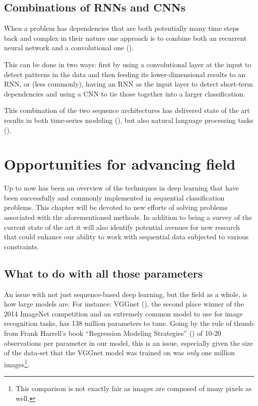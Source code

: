 \documentclass[]{book}
\let\rmarkdownfootnote\footnote%
\def\footnote{\protect\rmarkdownfootnote}
\theoremstyle{definition}
\theoremstyle{definition}
\theoremstyle{definition}
\theoremstyle{remark}
\begin{document}
\section{Combinations of RNNs and
CNNs}\label{combinations-of-rnns-and-cnns}

When a problem has dependencies that are both potentially many time
steps back and complex in their nature one approach is to combine both
an recurrent neural network and a convolutional one (\citet{rnn_cnn}).

This can be done in two ways: first by using a convolutional layer at
the input to detect patterns in the data and then feeding its
lower-dimensional results to an RNN, or (less commonly), having an RNN
as the input layer to detect short-term dependencies and using a CNN to
tie those together into a larger classification.

This combination of the two sequence architectures has delivered state
of the art results in both time-series modeling
(\citet{cnn_rnn_time_series}), but also natural language processing
tasks (\citet{crnn_text}).

\chapter{Opportunities for advancing field}\label{future}

Up to now has been an overview of the techniques in deep learning that
have been successfully and commonly implemented in sequential
classification problems. This chapter will be devoted to new efforts of
solving problems associated with the aforementioned methods. In addition
to being a survey of the current state of the art it will also identify
potential avenues for new research that could enhance our ability to
work with sequential data subjected to various constraints.

\section{What to do with all those
parameters}\label{what-to-do-with-all-those-parameters}

An issue with not just sequence-based deep learning, but the field as a
whole, is how large models are. For instance: VGGnet (\citet{vggnet}),
the second place winner of the 2014 ImageNet competition and an
extremely common model to use for image recognition tasks, has 138
million parameters to tune. Going by the rule of thumb from Frank
Harrell's book ``Regression Modeling Strategies'' (\citet{rms}) of 10-20
observations per parameter in our model, this is an issue, especially
given the size of the data-set that the VGGnet model was trained on was
\emph{only} one million images\footnote{This comparison is not exactly
  fair as images are composed of many pixels as well.}.
\end{document}
